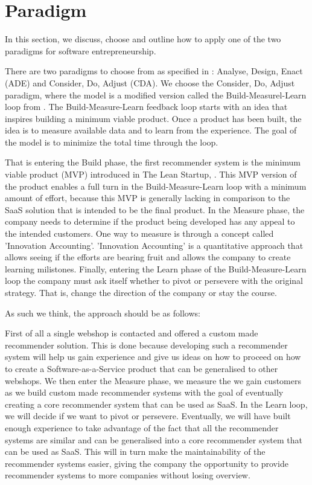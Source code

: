 \section{Paradigm}
In this section, we discuss, choose and outline how to apply one of the two paradigms for software entrepreneurship.

There are two paradigms to choose from as specified in \citet[pg. 30-32]{book:jrose}: Analyse, Design, Enact (ADE) and Consider, Do, Adjust (CDA). 
We choose the Consider, Do, Adjust paradigm, where the model is a modified version called the Build-Measurel-Learn loop from \citet[pg. 75]{ries2011lean}. 
The Build-Measure-Learn feedback loop starts with an idea that inspires building a minimum viable product.
Once a product has been built, the idea is to measure available data and to learn from the experience.
The goal of the model is to minimize the total time through the loop. 

That is entering the Build phase, the first recommender system is the minimum viable product (MVP) introduced in The Lean Startup, \citep[pg. 77]{ries2011lean}.
This MVP version of the product enables a full turn in the Build-Measure-Learn loop with a minimum amount of effort, because this MVP is generally lacking in comparison to the SaaS solution that is intended to be the final product.
In the Measure phase, the company needs to determine if the product being developed has any appeal to the intended customers. 
One way to measure is through a concept called 'Innovation Accounting'\citep[pg. 77]{ries2011lean}.
'Innovation Accounting' is a quantitative approach that allows seeing if the efforts are bearing fruit and allows the company to create learning milistones. 
Finally, entering the Learn phase of the Build-Measure-Learn loop the company must ask itself whether to pivot or persevere with the original strategy.
That is, change the direction of the company or stay the course. 

As such we think, the approach should be as follows:

First of all a single webshop is contacted and offered a custom made recommender solution. 
This is done because developing such a recommender system will help us gain experience and give us ideas on how to proceed on how to create a Software-as-a-Service product that can be generalised to other webshops.
We then enter the Measure phase, we measure the we gain customers as we build custom made recommender systems with the goal of eventually creating a core recommender system that can be used as SaaS.
In the Learn loop, we will decide if we want to pivot or persevere. Eventually, we will have built enough experience to take advantage of the fact that all the recommender systems are similar and can be generalised into a core recommender system that can be used as SaaS.
This will in turn make the maintainability of the recommender systems easier, giving the company the opportunity to provide recommender systems to more companies without losing overview. 

